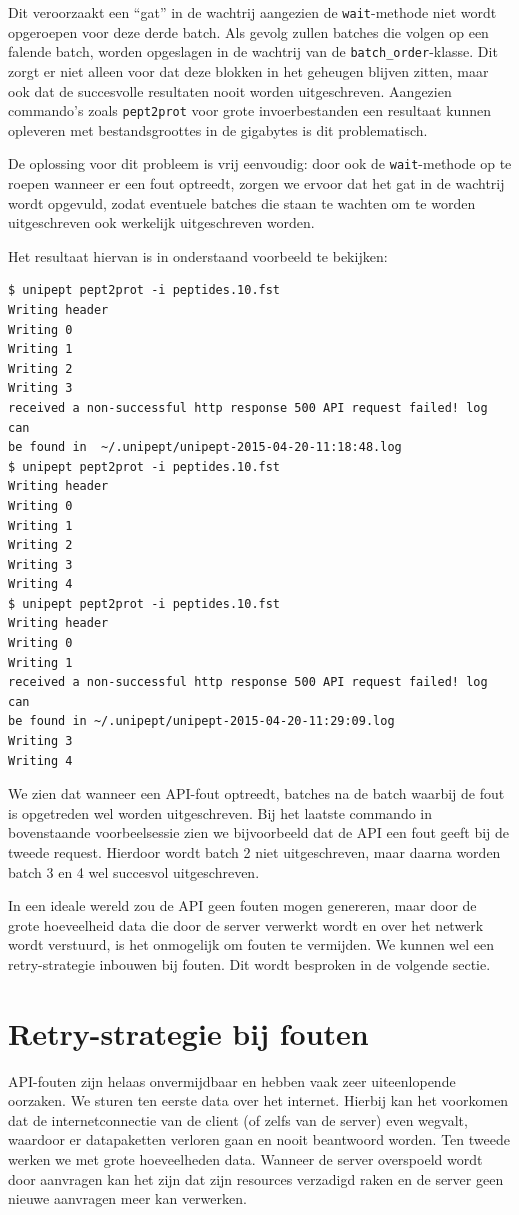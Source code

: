 Dit veroorzaakt een ``gat'' in de 
wachtrij aangezien de \texttt{wait}-methode niet wordt opgeroepen voor
deze derde batch. Als gevolg zullen batches die volgen op een falende
batch, worden opgeslagen in de wachtrij van de \texttt{batch\_order}-klasse. Dit
zorgt er niet alleen voor dat deze blokken in het geheugen blijven zitten, maar
ook dat de succesvolle resultaten nooit worden uitgeschreven. Aangezien
commando's zoals \texttt{pept2prot} voor grote invoerbestanden een resultaat
kunnen opleveren met bestandsgroottes in de gigabytes is dit problematisch.

De oplossing voor dit probleem is vrij eenvoudig: door ook de 
\texttt{wait}-methode op te roepen wanneer er een fout optreedt, zorgen we 
ervoor dat het gat in de wachtrij wordt opgevuld, zodat eventuele batches die 
staan te wachten om te worden uitgeschreven ook werkelijk uitgeschreven worden.

Het resultaat hiervan is in onderstaand voorbeeld te bekijken:

\begin{lstlisting}
$ unipept pept2prot -i peptides.10.fst
Writing header
Writing 0
Writing 1
Writing 2
Writing 3
received a non-successful http response 500 API request failed! log can 
be found in  ~/.unipept/unipept-2015-04-20-11:18:48.log
$ unipept pept2prot -i peptides.10.fst
Writing header
Writing 0
Writing 1
Writing 2
Writing 3
Writing 4
$ unipept pept2prot -i peptides.10.fst
Writing header
Writing 0
Writing 1
received a non-successful http response 500 API request failed! log can 
be found in ~/.unipept/unipept-2015-04-20-11:29:09.log
Writing 3
Writing 4
\end{lstlisting}

We zien dat wanneer een API-fout optreedt,  batches na de batch waarbij de fout
is opgetreden wel worden uitgeschreven. Bij het laatste commando in bovenstaande
voorbeelsessie zien we bijvoorbeeld dat de API een fout geeft bij de tweede
request. Hierdoor wordt batch 2 niet uitgeschreven, maar daarna worden batch 3
en 4 wel succesvol uitgeschreven.

In een ideale wereld zou de API geen fouten mogen genereren, maar door de grote
hoeveelheid data die door de server verwerkt wordt en over het netwerk wordt
verstuurd, is het onmogelijk om fouten te vermijden. We kunnen wel een
retry-strategie inbouwen bij fouten. Dit wordt besproken in de volgende sectie.

\section{Retry-strategie bij fouten}
API-fouten zijn helaas onvermijdbaar en hebben vaak zeer uiteenlopende 
oorzaken. We sturen ten eerste data over het internet. Hierbij kan het 
voorkomen dat de internetconnectie van de client (of zelfs van de server) even 
wegvalt, waardoor er datapaketten verloren gaan en nooit beantwoord worden. Ten 
tweede werken we met grote hoeveelheden data. Wanneer de server overspoeld 
wordt door aanvragen kan het zijn dat zijn resources verzadigd raken en de 
server geen 
nieuwe aanvragen meer kan verwerken.


